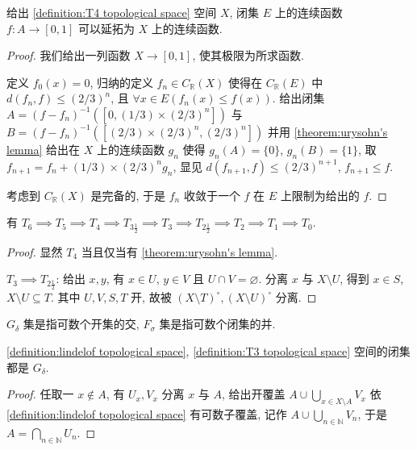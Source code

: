 \begin{theorem}[Tietze 延拓]
    \label {theorem:tietze's extension}
    给出 \ref{definition:T4 topological space} 空间 \(X\), 闭集 \(E\) 上的连续函数 \(f : A \to [0,1]\) 可以延拓为 \(X\) 上的连续函数.

    \begin{proof}
        我们给出一列函数 \(X \to [0,1]\), 使其极限为所求函数.

        定义 \(f_0 (x) = 0\), 归纳的定义 \(f_n \in C_\mathbb{R} (X)\) 使得在 \(C_\mathbb{R} (E)\) 中 \(d (f_n, f) \le (2/3)^n\), 且 \(\forall x \in E (f_n (x) \le f(x))\).
        给出闭集 \(A = {(f - f_n)}^{-1} ([0,(1/3) \times {(2/3)}^n])\) 与 \(B = {(f - f_n)}^{-1} ([(2/3) \times {(2/3)}^n,{(2/3)}^n])\) 并用 \ref{theorem:urysohn's lemma} 给出在
        \(X\) 上的连续函数 \(g_n\) 使得 \(g_n (A) = \{0\}\), \(g_n (B) = \{1\}\), 取 \(f_{n+1} = f_n + (1/3) \times (2/3)^n g_n\), 显见 \(d (f_{n+1}, f) \le (2/3)^{n+1}\), \(f_{n+1} \le f\).

        考虑到 \(C_\mathbb{R} (X)\) 是完备的, 于是 \(f_n\) 收敛于一个 \(f\) 在 \(E\) 上限制为给出的 \(f\).
    \end{proof}
\end{theorem}

\begin{lemma}
    有 \(T_6 \implies T_5 \implies T_4 \implies T_{3 \frac{1}{2}} \implies T_3 \implies T_{2 \frac{1}{2}} \implies T_2 \implies T_1 \implies T_0\).

    \begin{proof}
        显然 \(T_4\) 当且仅当有 \ref{theorem:urysohn's lemma}.

        \(T_3 \implies T_{2 \frac{1}{2}}\): 给出 \(x,y\), 有 \(x \in U\), \(y \in V\) 且 \(U \cap V = \varnothing\).
        分离 \(x\) 与 \(X \setminus U\), 得到 \(x \in S\), \(X \setminus U \subseteq T\). 其中 \(U,V,S,T\) 开, 故被 \({(X \setminus T)}^\circ,{(X \setminus U)}^\circ\) 分离.
    \end{proof}
\end{lemma}

\begin{definition}
    \(G_\delta\) 集是指可数个开集的交, \(F_\sigma\) 集是指可数个闭集的并.
\end{definition}

\begin{lemma}
    \ref{definition:lindelof topological space}, \ref{definition:T3 topological space} 空间的闭集都是 \(G_\delta\).

    \begin{proof}
        任取一 \(x \notin A\), 有 \(U_x,V_x\) 分离 \(x\) 与 \(A\), 给出开覆盖 \(A \cup \bigcup_{x \in X \setminus A} V_x\)
        依 \ref{definition:lindelof topological space} 有可数子覆盖, 记作 \(A \cup \bigcup_{n \in \mathbb{N}} V_n\), 于是 \(A = \bigcap_{n \in \mathbb{N}} U_n\).
    \end{proof}
\end{lemma}

